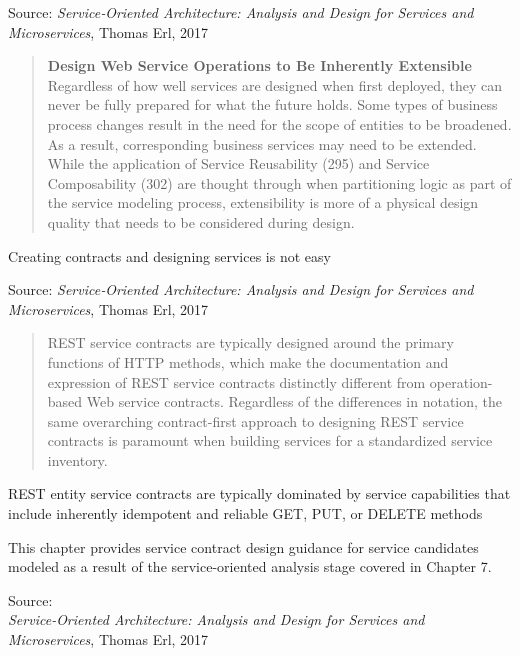 \documentclass[Screen16to9,17pt]{foils}
\begin{document}

Source: {\footnotesize
\emph{Service‑Oriented Architecture: Analysis and Design for Services and Microservices}, Thomas Erl, 2017}




\begin{quote}{\bf
Design Web Service Operations to Be Inherently Extensible}\\
Regardless of how well services are designed when first deployed, they can never be fully prepared for what the future holds. Some types of business process changes result in the need for the scope of entities to be broadened. As a result, corresponding business services may need to be extended. While the application of Service Reusability (295) and Service Composability (302) are thought through when partitioning logic as part of the service modeling process, extensibility is more of a physical design quality that needs to be considered during design.
\end{quote}

\begin{list2}
\item Creating contracts and designing services is not easy
\end{list2}

Source: {\footnotesize
\emph{Service‑Oriented Architecture: Analysis and Design for Services and Microservices}, Thomas Erl, 2017}






\begin{quote}
REST service contracts are typically designed around the primary functions of HTTP methods, which make the documentation and expression of REST service contracts distinctly different from operation-based Web service contracts. Regardless of the differences in notation, the same overarching contract-first approach to designing REST service contracts is paramount when building services for a standardized service inventory.
\end{quote}

\begin{list2}
\item REST entity service contracts are typically dominated by service capabilities that include inherently idempotent and reliable GET, PUT, or DELETE methods
\item This chapter provides service contract design guidance for service candidates modeled as a result of the service-oriented analysis stage covered in Chapter 7.
\end{list2}
Source: {\footnotesize\\
\emph{Service‑Oriented Architecture: Analysis and Design for Services and Microservices}, Thomas Erl, 2017}
\end{document}
